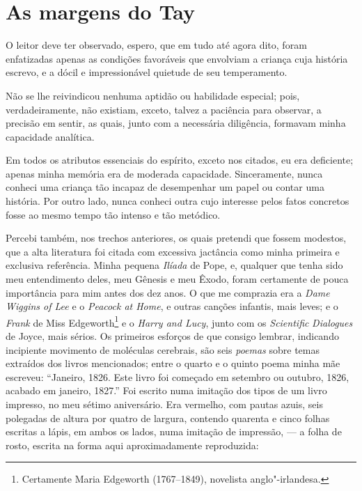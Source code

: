 \chapter{As margens do Tay} %

O leitor deve ter observado, espero, que em tudo até agora dito,
foram enfatizadas apenas as condições favoráveis que envolviam a criança
cuja história escrevo, e a dócil e impressionável quietude de seu
temperamento.

Não se lhe reivindicou nenhuma aptidão ou habilidade especial; pois,
verdadeiramente, não existiam, exceto, talvez a paciência para observar,
a precisão em sentir, as quais, junto com a necessária diligência,
formavam minha capacidade analítica.

Em todos os atributos essenciais do espírito, exceto nos citados, eu era
deficiente; apenas minha memória era de moderada capacidade.
Sinceramente, nunca conheci uma criança tão incapaz de desempenhar um
papel ou contar uma história. Por outro lado, nunca conheci outra cujo
interesse pelos fatos concretos fosse ao mesmo tempo tão intenso e tão
metódico.

Percebi também, nos trechos anteriores, os quais pretendi que fossem
modestos, que a alta literatura foi citada com excessiva jactância como
minha primeira e exclusiva referência. Minha pequena \textit{Ilíada} de
Pope, e, qualquer que tenha sido meu entendimento deles, meu Gênesis e
meu Êxodo, foram certamente de pouca importância para mim antes dos dez
anos. O que me comprazia era a \textit{Dame Wiggins of Lee} e o
\textit{Peacock at Home}, e outras canções infantis, mais leves; e o
\textit{Frank} de Miss Edgeworth\footnote{Certamente Maria Edgeworth
  (1767--1849), novelista anglo"-irlandesa.} e o
\textit{Harry and Lucy}, junto com os \textit{Scientific} \textit{Dialogues}
de Joyce, mais sérios. Os primeiros esforços de que consigo lembrar,
indicando incipiente movimento de moléculas cerebrais, são seis
\textit{poemas} sobre temas extraídos dos livros mencionados; entre o quarto
e o quinto poema minha mãe escreveu: ``Janeiro, 1826. Este livro foi
começado em setembro ou outubro, 1826, acabado em janeiro, 1827.'' Foi
escrito numa imitação dos tipos de um livro impresso, no meu sétimo
aniversário. Era vermelho, com pautas azuis, seis polegadas de altura
por quatro de largura, contendo quarenta e cinco folhas escritas a
lápis, em ambos os lados, numa imitação de impressão, --- a folha de
rosto, escrita na forma aqui aproximadamente reproduzida:

